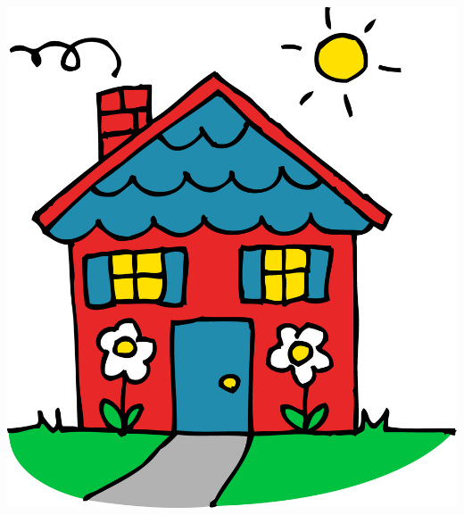 \documentclass[17pt]{beamer}
\begin{document}
\begin{frame}
\begin{flushright}
\href{http://www.iittutorials.com/tutorials/}{\includegraphics[scale=0.1]{images/for_the_love_of_advertising.png}}
\end{flushright}

\end{frame}
\end{document}
